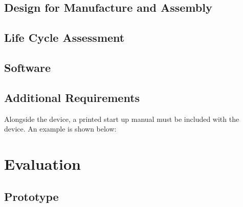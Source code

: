 \documentclass{article}
\begin{document}
\subsection{Design for Manufacture and Assembly}

\subsection{Life Cycle Assessment}

\pagebreak

\pagebreak

\pagebreak

\subsection{Software}

\pagebreak

\pagebreak




\pagebreak

\pagebreak


\pagebreak

\pagebreak

\pagebreak

\subsection{Additional Requirements}
Alongside the device, a printed start up manual must be included with the device. An example is shown below:



\pagebreak

\section{Evaluation} \label{eval}
\subsection{Prototype}


\pagebreak
\end{document}
